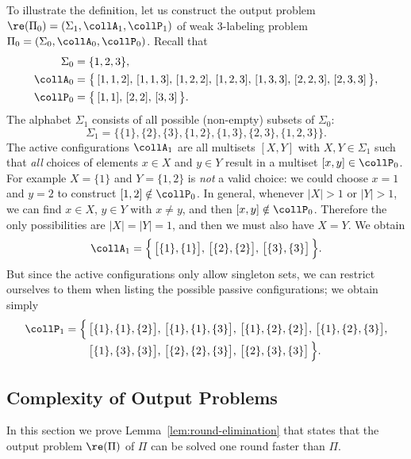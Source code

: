 To illustrate the definition, let us construct the output problem $\re(\Pi_0) = (\Sigma_1, \collA_1, \collP_1)$ of weak 3-labeling problem $\Pi_0 = (\Sigma_0, \collA_0, \collP_0)$. Recall that
\begin{align*}
	\Sigma_0 &= \{ 1,2,3 \}, \\
	\collA_0 &= \bigl\{\,
		[ 1, 1, 2 ],\,
		[ 1, 1, 3 ],\,
		[ 1, 2, 2 ],\,
		[ 1, 2, 3 ],\,
		[ 1, 3, 3 ],\,
		[ 2, 2, 3 ],\,
		[ 2, 3, 3 ]
	\,\bigr\}, \\
	\collP_0 &= \bigl\{\,
		[ 1, 1 ],\,
		[ 2, 2 ],\,
		[ 3, 3 ]
	\,\bigr\}. 
\end{align*}
The alphabet $\Sigma_1$ consists of all possible (non-empty) subsets of $\Sigma_0$: 
\[
	\Sigma_1 = \bigl\{ \{ 1 \}, \{ 2 \}, \{ 3 \}, \{ 1, 2 \}, \{ 1, 3 \}, \{ 2, 3 \}, \{ 1, 2, 3 \} \bigr\}.
\]
The active configurations $\collA_1$ are all multisets $[ X,Y ]$ with $X, Y \in \Sigma_1$ such that \emph{all} choices of elements $x \in X$ and $y \in Y$ result in a multiset $[x,y] \in \collP_0$. For example $X = \{1\}$ and $Y = \{1,2\}$ is \emph{not} a valid choice: we could choose $x = 1$ and $y = 2$ to construct $[1,2] \notin \collP_0$. In general, whenever $|X| > 1$ or $|Y| > 1$, we can find $x \in X$, $y \in Y$ with $x \ne y$, and then $[x,y] \notin \collP_0$. Therefore the only possibilities are $|X| = |Y| = 1$, and then we must also have $X = Y$. We obtain
\[ 
\collA_1 = \Bigl\{\, \bigl[\{ 1 \}, \{1 \}\bigr],\, \bigl[\{ 2 \}, \{2 \}\bigr],\, \bigl[\{ 3 \}, \{3 \}\bigr] \,\Bigr\}. 
\] 
But since the active configurations only allow singleton sets, we can restrict ourselves to them when listing the possible passive configurations; we obtain simply
\[
\begin{split}
	\collP_1 = \Bigl\{\,
		&\bigl[ \{1\}, \{1\}, \{2\} \bigr],\,
		\bigl[ \{1\}, \{1\}, \{3\} \bigr],\,
		\bigl[ \{1\}, \{2\}, \{2\} \bigr],\,
		\bigl[ \{1\}, \{2\}, \{3\} \bigr],\\[-2pt]
		&\bigl[ \{1\}, \{3\}, \{3\} \bigr],\,
		\bigl[ \{2\}, \{2\}, \{3\} \bigr],\,
		\bigl[ \{2\}, \{3\}, \{3\} \bigr]
	\,\Bigr\}.
\end{split}
\]

\subsection{Complexity of Output Problems}

In this section we prove Lemma~\ref{lem:round-elimination} that states that the output problem $\re(\Pi)$ of $\Pi$ can be solved one round faster than $\Pi$. 

